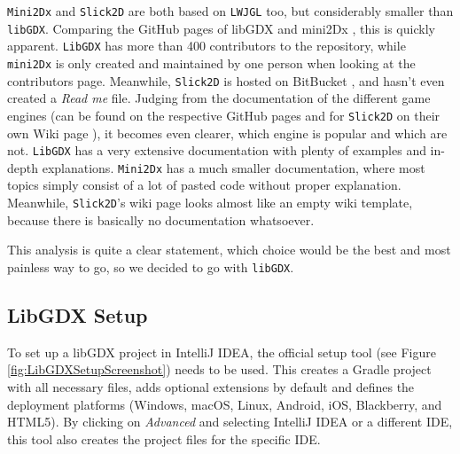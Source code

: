\documentclass[12p]{article}
\begin{document}
\texttt{Mini2Dx} and \texttt{Slick2D} are both based on \texttt{LWJGL} too, but considerably smaller than \texttt{libGDX}. Comparing the GitHub pages of libGDX \cite{libgDXGitHub} and mini2Dx \cite{mini2DxGitHub}, this is quickly apparent. \texttt{LibGDX} has more than 400 contributors to the repository, while \texttt{mini2Dx} is only created and maintained by one person when looking at the contributors page. Meanwhile, \texttt{Slick2D} is hosted on BitBucket \cite{Slick2DBitBucket}, and hasn't even created a \emph{Read me} file. Judging from the documentation of the different game engines (can be found on the respective GitHub pages and for \texttt{Slick2D} on their own Wiki page \cite{Slick2DWiki}), it becomes even clearer, which engine is popular and which are not. \texttt{LibGDX} has a very extensive documentation with plenty of examples and in-depth explanations. \texttt{Mini2Dx} has a much smaller documentation, where most topics simply consist of a lot of pasted code without proper explanation. Meanwhile, \texttt{Slick2D}'s wiki page looks almost like an empty wiki template, because there is basically no documentation whatsoever.

This analysis is quite a clear statement, which choice would be the best and most painless way to go, so we decided to go with \texttt{libGDX}.


\newpage
\subsection{LibGDX Setup} \label{DocSetup}

To set up a libGDX project in IntelliJ IDEA, the official setup tool (see Figure \ref{fig:LibGDXSetupScreenshot}) needs to be used. This creates a Gradle project with all necessary files, adds optional extensions by default and defines the deployment platforms (Windows, macOS, Linux, Android, iOS, Blackberry, and HTML5). By clicking on \emph{Advanced} and selecting IntelliJ IDEA or a different IDE, this tool also creates the project files for the specific IDE.
\end{document}
